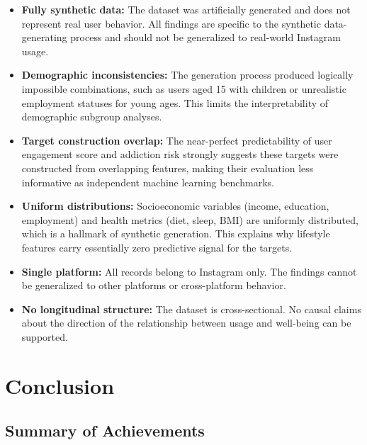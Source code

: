 \documentclass[12pt,a4paper]{article}
\begin{document}
\begin{itemize}
    \item \textbf{Fully synthetic data:} The dataset was artificially generated and does not represent real user behavior. All findings are specific to the synthetic data-generating process and should not be generalized to real-world Instagram usage.
    
    \item \textbf{Demographic inconsistencies:} The generation process produced logically impossible combinations, such as users aged 15 with children or unrealistic employment statuses for young ages. This limits the interpretability of demographic subgroup analyses.
    
    \item \textbf{Target construction overlap:} The near-perfect predictability of user engagement score and addiction risk strongly suggests these targets were constructed from overlapping features, making their evaluation less informative as independent machine learning benchmarks.
    
    \item \textbf{Uniform distributions:} Socioeconomic variables (income, education, employment) and health metrics (diet, sleep, BMI) are uniformly distributed, which is a hallmark of synthetic generation. This explains why lifestyle features carry essentially zero predictive signal for the targets.
    
    \item \textbf{Single platform:} All records belong to Instagram only. The findings cannot be generalized to other platforms or cross-platform behavior.
    
    \item \textbf{No longitudinal structure:} The dataset is cross-sectional. No causal claims about the direction of the relationship between usage and well-being can be supported.
\end{itemize}

 \newpage

\section{Conclusion}
 
\subsection{Summary of Achievements}
 
\end{document}
